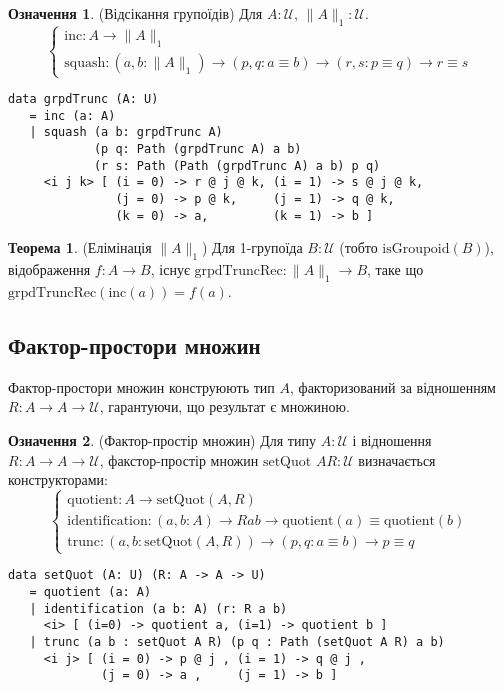 \documentclass{article}
\theoremstyle{definition}
\newtheorem{theorem}{Теорема}
\newtheorem{definition}{Означення}
\begin{document}
\begin{definition} (Відсікання групоїдів)
Для \( A : \mathcal{U} \), \( \| A \|_1 : \mathcal{U} \).
\[
\begin{cases}
\text{inc} : A \to \| A \|_1 \\
\text{squash} : (a, b : \| A \|_1) \to (p, q : a \equiv b) \to (r, s : p \equiv q) \to r \equiv s
\end{cases}
\]
\begin{lstlisting}
data grpdTrunc (A: U)
   = inc (a: A)
   | squash (a b: grpdTrunc A)
            (p q: Path (grpdTrunc A) a b)
            (r s: Path (Path (grpdTrunc A) a b) p q)
     <i j k> [ (i = 0) -> r @ j @ k, (i = 1) -> s @ j @ k,
               (j = 0) -> p @ k,     (j = 1) -> q @ k,
               (k = 0) -> a,         (k = 1) -> b ]
\end{lstlisting}
\end{definition}

\begin{theorem} (Елімінація \( \| A \|_1 \))
Для 1-групоїда \( B : \mathcal{U} \) (тобто \( \text{isGroupoid}(B) \)),
відображення \( f : A \to B \), існує \( \text{grpdTruncRec} : \| A \|_1 \to B \),
таке що \( \text{grpdTruncRec}(\text{inc}(a)) = f(a) \).
\end{theorem}

\newpage
\subsection{Фактор-простори множин}
Фактор-простори множин конструюють тип \( A \), факторизований за
відношенням \( R : A \to A \to \mathcal{U} \), гарантуючи, що результат є множиною.

\begin{definition} (Фактор-простір множин)
Для типу \( A : \mathcal{U} \) і відношення \( R : A \to A \to \mathcal{U} \),
факстор-простір множин \( \text{setQuot } A R : \mathcal{U} \) визначається конструкторами:
\[
\begin{cases}
\text{quotient} : A \to \text{setQuot}(A,R) \\
\text{identification} : (a, b : A) \to R a b \to \text{quotient}(a) \equiv \text{quotient}(b) \\
\text{trunc} : (a, b : \text{setQuot}(A,R)) \to (p, q : a \equiv b) \to p \equiv q
\end{cases}
\]
\begin{lstlisting}
data setQuot (A: U) (R: A -> A -> U)
   = quotient (a: A)
   | identification (a b: A) (r: R a b)
     <i> [ (i=0) -> quotient a, (i=1) -> quotient b ]
   | trunc (a b : setQuot A R) (p q : Path (setQuot A R) a b)
     <i j> [ (i = 0) -> p @ j , (i = 1) -> q @ j ,
             (j = 0) -> a ,     (j = 1) -> b ]
\end{lstlisting}
\end{definition}
\end{document}
